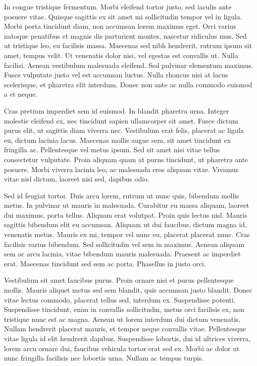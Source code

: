 \documentclass{article}
\begin{document}
In congue tristique fermentum. Morbi eleifend tortor justo, sed iaculis ante posuere vitae. Quisque sagittis ex sit amet mi sollicitudin tempor vel in ligula. Morbi porta tincidunt diam, non accumsan lorem maximus eget. Orci varius natoque penatibus et magnis dis parturient montes, nascetur ridiculus mus. Sed ut tristique leo, eu facilisis massa. Maecenas sed nibh hendrerit, rutrum ipsum sit amet, tempus velit. Ut venenatis dolor nisi, vel egestas est convallis ut. Nulla facilisi. Aenean vestibulum malesuada eleifend. Sed pulvinar elementum maximus. Fusce vulputate justo vel est accumsan luctus. Nulla rhoncus nisi at lacus scelerisque, et pharetra elit interdum. Donec non ante ac nulla commodo euismod a et neque.

Cras pretium imperdiet sem id euismod. In blandit pharetra urna. Integer molestie eleifend ex, nec tincidunt sapien ullamcorper sit amet. Fusce dictum purus elit, ut sagittis diam viverra nec. Vestibulum erat felis, placerat ac ligula eu, dictum lacinia lacus. Maecenas mollis augue sem, sit amet tincidunt ex fringilla ac. Pellentesque vel metus ipsum. Sed sit amet nisi vitae tellus consectetur vulputate. Proin aliquam quam at purus tincidunt, ut pharetra ante posuere. Morbi viverra lacinia leo, ac malesuada eros aliquam vitae. Vivamus vitae nisl dictum, laoreet nisi sed, dapibus odio.

Sed id feugiat tortor. Duis arcu lorem, rutrum ut nunc quis, bibendum mollis metus. In pulvinar ut mauris in malesuada. Curabitur eu massa aliquam, laoreet dui maximus, porta tellus. Aliquam erat volutpat. Proin quis lectus nisl. Mauris sagittis bibendum elit eu accumsan. Aliquam ut dui faucibus, dictum magna id, venenatis metus. Mauris ex mi, tempor vel nunc eu, placerat placerat nunc. Cras facilisis varius bibendum. Sed sollicitudin vel sem in maximus. Aenean aliquam sem ac arcu lacinia, vitae bibendum mauris malesuada. Praesent ac imperdiet erat. Maecenas tincidunt sed sem ac porta. Phasellus in justo orci.

Vestibulum sit amet faucibus purus. Proin ornare nisi et purus pellentesque mollis. Mauris aliquet metus sed sem blandit, quis accumsan justo blandit. Donec vitae lectus commodo, placerat tellus sed, interdum ex. Suspendisse potenti. Suspendisse tincidunt, enim in convallis sollicitudin, metus orci facilisis ex, non tristique nunc est ac magna. Aenean ut lorem interdum dui dictum venenatis. Nullam hendrerit placerat mauris, et tempor neque convallis vitae. Pellentesque vitae ligula id elit hendrerit dapibus. Suspendisse lobortis, dui id ultrices viverra, lorem arcu ornare dui, faucibus vehicula tortor erat sed ex. Morbi ac dolor ut nunc fringilla facilisis nec lobortis urna. Nullam ac tempus turpis.
\end{document}
